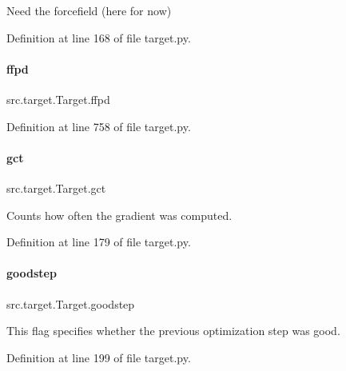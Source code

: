 Need the forcefield (here for now) 



Definition at line 168 of file target.\+py.

\mbox{\label{classsrc_1_1target_1_1Target_a48209401694b7ab1cd207f9f214caa7a}} 
\paragraph{\texorpdfstring{ffpd}{ffpd}}
{\footnotesize\ttfamily src.\+target.\+Target.\+ffpd}



Definition at line 758 of file target.\+py.

\mbox{\label{classsrc_1_1target_1_1Target_a12d4d43cc0344c23e687941c6df7c1c7}} 
\paragraph{\texorpdfstring{gct}{gct}}
{\footnotesize\ttfamily src.\+target.\+Target.\+gct}



Counts how often the gradient was computed. 



Definition at line 179 of file target.\+py.

\mbox{\label{classsrc_1_1target_1_1Target_a60944e53d96d66201273a52027896abb}} 
\paragraph{\texorpdfstring{goodstep}{goodstep}}
{\footnotesize\ttfamily src.\+target.\+Target.\+goodstep}



This flag specifies whether the previous optimization step was good. 



Definition at line 199 of file target.\+py.

